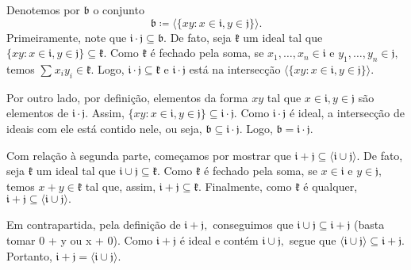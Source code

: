 \documentclass[AlgebraII/algebraII_notes.tex]{subfiles}
\begin{document}
\begin{proof*}
	Denotemos por \(\mathfrak{b}\) o conjunto
	\[
		\mathfrak{b}\coloneqq \langle \{xy:x\in \mathfrak{i}, y\in \mathfrak{j}\} \rangle.
	\]
	Primeiramente, note que \(\mathfrak{i}\cdot \mathfrak{j}\subseteq{\mathfrak{b}}.\) De fato, seja \(\mathfrak{k}\) um ideal tal que \(\{xy:x\in \mathfrak{i}, y\in \mathfrak{j}\}\subseteq{\mathfrak{k}}.\)
	Como \(\mathfrak{k}\) é fechado pela soma, se \(x_{1}, \dotsc, x_{n}\in \mathfrak{i}\) e \(y_{1},\dotsc,y_{n}\in \mathfrak{j},\) temos
	\(\sum\limits_{}^{}x_{i}y_{i}\in \mathfrak{k}.\) Logo, \(\mathfrak{i}\cdot \mathfrak{j}\subseteq{\mathfrak{k}}\) e \(\mathfrak{i}\cdot \mathfrak{j}\) está
	na intersecção \(\langle \{xy: x\in \mathfrak{i}, y\in \mathfrak{j}\} \rangle.\)

	Por outro lado, por definição, elementos da forma \(xy\) tal que \(x\in \mathfrak{i}, y\in \mathfrak{j}\) são elementos
	de \(\mathfrak{i}\cdot \mathfrak{j}.\) Assim, \(\{xy:x\in \mathfrak{i}, y\in \mathfrak{j}\}\subseteq{\mathfrak{i}\cdot \mathfrak{j}}.\) Como
	\(\mathfrak{i}\cdot \mathfrak{j}\) é ideal, a intersecção de ideais com ele está contido nele, ou seja, \(\mathfrak{b}\subseteq{\mathfrak{i}\cdot \mathfrak{j}}\).
	Logo, \(\mathfrak{b} = \mathfrak{i}\cdot \mathfrak{j}.\)

	Com relação à segunda parte, começamos por mostrar que \(\mathfrak{i}+\mathfrak{j}\subseteq{\langle \mathfrak{i}\cup \mathfrak{j} \rangle}.\) De fato,
	seja \(\mathfrak{k}\) um ideal tal que \(\mathfrak{i}\cup \mathfrak{j}\subseteq{\mathfrak{k}}.\) Como \(\mathfrak{k}\) é fechado pela soma,
	se \(x\in \mathfrak{i}\) e \(y\in \mathfrak{j},\) temos \(x+y\in \mathfrak{k}\) tal que, assim, \(\mathfrak{i} + \mathfrak{j}\subseteq{\mathfrak{k}}\).
	Finalmente, como \(\mathfrak{k}\) é qualquer, \(\mathfrak{i}+\mathfrak{j}\subseteq{\langle \mathfrak{i}\cup \mathfrak{j} \rangle}.\)

	Em contrapartida, pela definição de \(\mathfrak{i} + \mathfrak{j},\) conseguimos
	que \(\mathfrak{i}\cup \mathfrak{j}\subseteq{\mathfrak{i}+\mathfrak{j}}\) (basta tomar 0 + y ou x + 0).
	Como \(\mathfrak{i} + \mathfrak{j}\) é ideal e contém \(\mathfrak{i}\cup \mathfrak{j},\) segue que \(\langle \mathfrak{i}\cup \mathfrak{j} \rangle\subseteq{\mathfrak{i}+\mathfrak{j}}\).
	Portanto, \(\mathfrak{i}+\mathfrak{j} = \langle \mathfrak{i}\cup \mathfrak{j} \rangle.\) \qedsymbol
\end{proof*}
\end{document}
